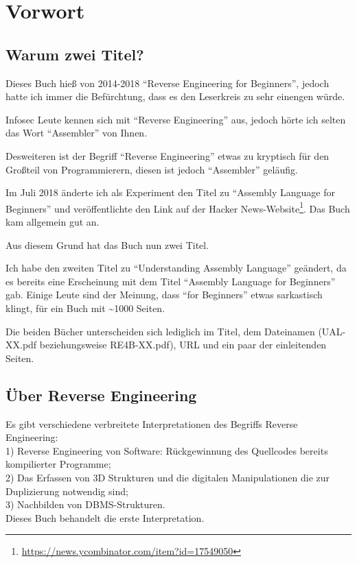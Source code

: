 \section*{Vorwort}

\subsection*{Warum zwei Titel?}
\label{TwoTitles}

Dieses Buch hieß von 2014-2018 ``Reverse Engineering for Beginners'', jedoch hatte ich immer die Befürchtung, dass es den Leserkreis zu sehr einengen würde.

Infosec Leute kennen sich mit ``Reverse Engineering'' aus, jedoch hörte ich selten das Wort ``Assembler'' von Ihnen.

Desweiteren ist der Begriff ``Reverse Engineering'' etwas zu kryptisch für den Großteil von Programmierern, diesen ist jedoch ``Assembler'' geläufig.

Im Juli 2018 änderte ich als Experiment den Titel zu ``Assembly Language for Beginners'' und veröffentlichte den Link auf der Hacker News-Website\footnote{\url{https://news.ycombinator.com/item?id=17549050}}. Das Buch kam allgemein gut an.

Aus diesem Grund hat das Buch nun zwei Titel.

Ich habe den zweiten Titel zu ``Understanding Assembly Language'' geändert, da es bereits eine Erscheinung mit dem Titel ``Assembly Language for Beginners'' gab. Einige Leute sind der Meinung, dass ``for Beginners'' etwas sarkastisch klingt, für ein Buch mit \textasciitilde{}1000 Seiten.

Die beiden Bücher unterscheiden sich lediglich im Titel, dem Dateinamen (UAL-XX.pdf beziehungsweise RE4B-XX.pdf), URL und ein paar der einleitenden Seiten.

\subsection*{Über Reverse Engineering}

Es gibt verschiedene verbreitete Interpretationen des Begriffs Reverse Engineering:\\
1) Reverse Engineering von Software: Rückgewinnung des Quellcodes bereits kompilierter Programme;\\
2) Das Erfassen von 3D Strukturen und die digitalen Manipulationen die zur Duplizierung notwendig sind;\\
3) Nachbilden von \ac{DBMS}-Strukturen.\\
Dieses Buch behandelt die erste Interpretation.

